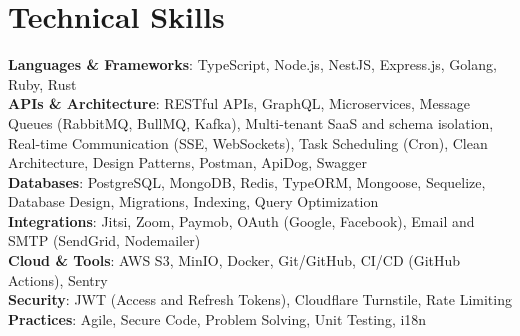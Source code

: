 \documentclass[a4paper,11pt]{article}
\begin{document}
\section{Technical Skills}
 \begin{itemize}[leftmargin=0.15in, label={}]
    \small{\item{
     \textbf{Languages \& Frameworks}{: TypeScript, Node.js, NestJS, Express.js, Golang, Ruby, Rust} \\
     \textbf{APIs \& Architecture}{: RESTful APIs, GraphQL, Microservices, Message Queues (RabbitMQ, BullMQ, Kafka), Multi-tenant SaaS and schema isolation, Real-time Communication (SSE, WebSockets), Task Scheduling (Cron), Clean Architecture, Design Patterns, Postman, ApiDog, Swagger} \\
     \textbf{Databases}{: PostgreSQL, MongoDB, Redis, TypeORM, Mongoose, Sequelize, Database Design, Migrations, Indexing, Query Optimization} \\
     \textbf{Integrations}{: Jitsi, Zoom, Paymob, OAuth (Google, Facebook), Email and SMTP (SendGrid, Nodemailer)} \\
     \textbf{Cloud \& Tools}{: AWS S3, MinIO, Docker, Git/GitHub, CI/CD (GitHub Actions), Sentry} \\
     \textbf{Security}{: JWT (Access and Refresh Tokens), Cloudflare Turnstile, Rate Limiting} \\
     \textbf{Practices}{: Agile, Secure Code, Problem Solving, Unit Testing, i18n}
    }}
 \end{itemize}


\end{document}
